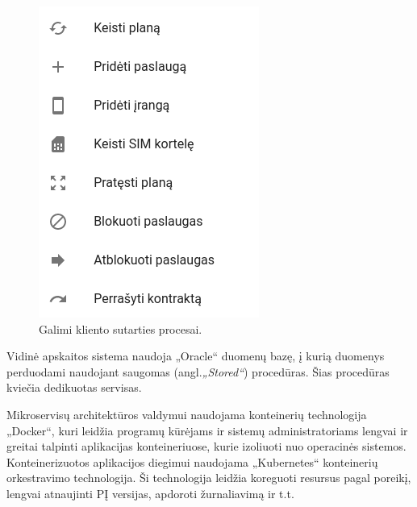 \begin{figure}[H]
    \centering
    \includegraphics[scale=0.4]{img/options.png}
    \caption{Galimi kliento sutarties procesai.}
    \label{img:options}
\end{figure}

Vidinė apskaitos sistema naudoja „Oracle“ duomenų bazę, į kurią duomenys perduodami naudojant saugomas (angl.\textit{„Stored“}) procedūras. Šias procedūras kviečia dedikuotas servisas.

Mikroservisų architektūros valdymui naudojama konteinerių technologija „Docker“, kuri leidžia programų kūrėjams ir sistemų administratoriams lengvai ir greitai
talpinti aplikacijas konteineriuose, kurie izoliuoti nuo operacinės sistemos. Konteinerizuotos aplikacijos diegimui naudojama „Kubernetes“ konteinerių orkestravimo technologija.
Ši technologija leidžia koreguoti resursus pagal poreikį, lengvai atnaujinti PĮ versijas, apdoroti žurnaliavimą ir t.t.
